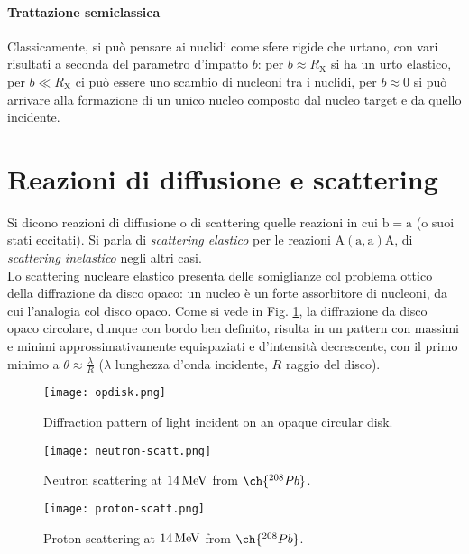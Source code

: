 \paragraph{Trattazione semiclassica}

Classicamente, si può pensare ai nuclidi come sfere rigide che urtano, con vari risultati a seconda del parametro d'impatto $ b $: per $ b \approx R_{\mathrm{X}} $ si ha un urto elastico, per $ b \ll R_{\mathrm{X}} $ ci può essere uno scambio di nucleoni tra i nuclidi, per $ b \approx 0 $ si può arrivare alla formazione di un unico nucleo composto dal nucleo target e da quello incidente.

\section{Reazioni di diffusione e scattering}

Si dicono reazioni di diffusione o di scattering quelle reazioni in cui $ \mathrm{b} = \mathrm{a} $ (o suoi stati eccitati). Si parla di \textit{scattering elastico} per le reazioni $ \mathrm{A} \left( \mathrm{a},\mathrm{a} \right) \mathrm{A} $, di \textit{scattering inelastico} negli altri casi.\\
Lo scattering nucleare elastico presenta delle somiglianze col problema ottico della diffrazione da disco opaco: un nucleo è un forte assorbitore di nucleoni, da cui l'analogia col disco opaco. Come si vede in Fig. \ref{opdisk}, la diffrazione da disco opaco circolare, dunque con bordo ben definito, risulta in un pattern con massimi e minimi approssimativamente equispaziati e d'intensità decrescente, con il primo minimo a $ \theta \approx \frac{\lambda}{R} $ ($ \lambda $ lunghezza d'onda incidente, $ R $ raggio del disco).

\begin{figure}[!b]
	\centering
	\texttt{[image: opdisk.png]}
	\caption{Diffraction pattern of light incident on an opaque circular disk.}
	\label{opdisk}
\end{figure}

\begin{figure}[H]
	\centering
	\texttt{[image: neutron-scatt.png]}
	\caption{Neutron scattering at $ 14\,\mathrm{MeV} $ from $ \ch{^{208}Pb} $.}
	\label{neutron-scatt}
\end{figure}
\begin{figure}[H]
	\centering
	\texttt{[image: proton-scatt.png]}
	\caption{Proton scattering at $ 14\,\mathrm{MeV} $ from $ \ch{^{208}Pb} $.}
	\label{proton-scatt}
\end{figure}

